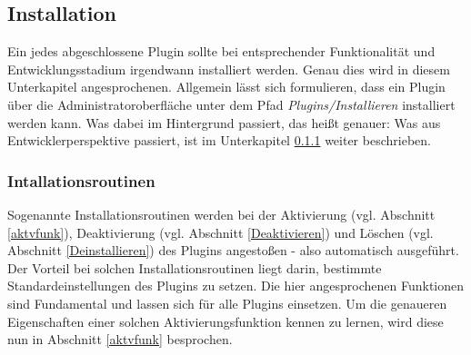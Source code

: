\subsection{Installation}
Ein jedes abgeschlossene Plugin sollte bei entsprechender Funktionalität und Entwicklungsstadium irgendwann installiert werden. Genau dies wird in diesem Unterkapitel angesprochenen.\newline
Allgemein lässt sich formulieren, dass ein Plugin über die Administratoroberfläche unter dem Pfad \emph{Plugins/Installieren} installiert werden kann.\newline
Was dabei im Hintergrund passiert, das heißt genauer: Was aus Entwicklerperspektive passiert, ist im Unterkapitel \ref{insrout} weiter beschrieben. 
\subsubsection{Intallationsroutinen}\label{insrout}
Sogenannte Installationsroutinen werden bei der Aktivierung (vgl. Abschnitt \ref{aktvfunk}), Deaktivierung (vgl. Abschnitt \ref{Deaktivieren}) und Löschen (vgl. Abschnitt \ref{Deinstallieren}) des Plugins angestoßen - also automatisch ausgeführt.\newline
Der Vorteil bei solchen Installationsroutinen liegt darin, bestimmte Standardeinstellungen des Plugins zu setzen. Die hier angesprochenen Funktionen sind Fundamental und lassen sich für alle Plugins einsetzen.\newline
Um die genaueren Eigenschaften einer solchen Aktivierungsfunktion kennen zu lernen, wird diese nun in Abschnitt \ref{aktvfunk} besprochen.
